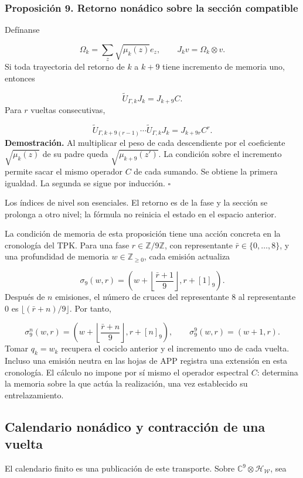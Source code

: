 \subsubsection*{Proposición 9. Retorno nonádico sobre la sección compatible}
Defínanse

\[
\Omega_k=\sum_z\sqrt{\mu_k(z)}e_z,\qquad
J_kv=\Omega_k\otimes v.
\]
Si toda trayectoria del retorno de \(k\) a \(k+9\) tiene incremento de memoria uno, entonces

\[
\widetilde U_{\Gamma,k}J_k=J_{k+9}C.
\]
Para \(r\) vueltas consecutivas,

\[
\widetilde U_{\Gamma,k+9(r-1)}\cdots
\widetilde U_{\Gamma,k}J_k=J_{k+9r}C^r.
\]
\textbf{Demostración.} Al multiplicar el peso de cada descendiente por el coeficiente \(\sqrt{\mu_k(z)}\) de su padre queda \(\sqrt{\mu_{k+9}(z')}\). La condición sobre el incremento permite sacar el mismo operador \(C\) de cada sumando. Se obtiene la primera igualdad. La segunda se sigue por inducción. \hfill\(\square\)

Los índices de nivel son esenciales. El retorno es de la fase y la sección se prolonga a otro nivel; la fórmula no reinicia el estado en el espacio anterior.

La condición de memoria de esta proposición tiene una acción concreta en la cronología del TPK. Para una fase \(r\in\mathbb Z/9\mathbb Z\), con representante \(\bar r\in\{0,\ldots,8\}\), y una profundidad de memoria \(w\in\mathbb Z_{\geq0}\), cada emisión actualiza

\[
\sigma_9(w,r)=
\left(w+\left\lfloor\frac{\bar r+1}{9}\right\rfloor,r+[1]_9\right).
\]
Después de \(n\) emisiones, el número de cruces del representante \(8\) al representante \(0\) es \(\lfloor(\bar r+n)/9\rfloor\). Por tanto,

\[
\sigma_9^n(w,r)=
\left(w+\left\lfloor\frac{\bar r+n}{9}\right\rfloor,r+[n]_9\right),
\qquad
\sigma_9^9(w,r)=(w+1,r).
\]
Tomar \(q_k=w_k\) recupera el cociclo anterior y el incremento uno de cada vuelta. Incluso una emisión neutra en las hojas de APP registra una extensión en esta cronología. El cálculo no impone por sí mismo el operador espectral \(C\): determina la memoria sobre la que actúa la realización, una vez establecido su entrelazamiento.

\subsection{Calendario nonádico y contracción de una vuelta}
El calendario finito es una publicación de este transporte. Sobre \(\mathbb C^9\otimes\mathcal H_{\mathscr W}\), sea

